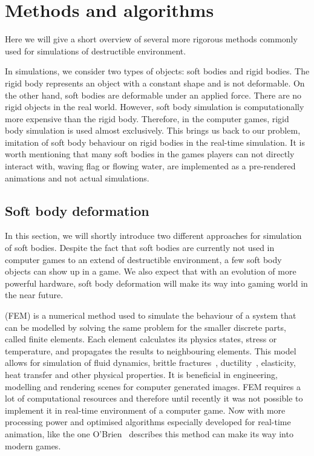 \section{Methods and algorithms}

Here we will give a short overview of several more rigorous methods commonly used for simulations of destructible environment. 

In simulations, we consider two types of objects: soft bodies and rigid bodies. The rigid body represents an object with a constant shape and is not deformable. On the other hand, soft bodies are deformable under an applied force. There are no rigid objects in the real world. However, soft body simulation is computationally more expensive than the rigid body. Therefore, in the computer games, rigid body simulation is used almost exclusively. This brings us back to our problem, imitation of soft body behaviour on rigid bodies in the real-time simulation. It is worth mentioning that many soft bodies in the games players can not directly interact with, \eg waving flag or flowing water, are implemented as a pre-rendered animations and not actual simulations.

\subsection{Soft body deformation}
In this section, we will shortly introduce two different approaches for simulation of soft bodies. Despite the fact that soft bodies are currently not used in computer games to an extend of destructible environment, a few soft body objects can show up in a game. We also expect that with an evolution of more powerful hardware, soft body deformation will make its way into gaming world in the near future.
\label{sec:softBody}

 (FEM) is a numerical method used to simulate the behaviour of a system that can be modelled by solving the same problem for the smaller discrete parts, called finite elements. Each element calculates its physics states, \eg stress or temperature, and propagates the results to neighbouring elements. This model allows for simulation of fluid dynamics, brittle fractures~\cite{brittlefracture}, ductility~\cite{ductilefracture}, elasticity, heat transfer and other physical properties. It is beneficial in engineering, modelling and rendering scenes for computer generated images. FEM requires a lot of computational resources and therefore until recently it was not possible to implement it in real-time environment of a computer game. Now with more processing power and optimised algorithms especially developed for real-time animation, like the one O'Brien~\cite{femingames} describes this method can make its way into modern games.

